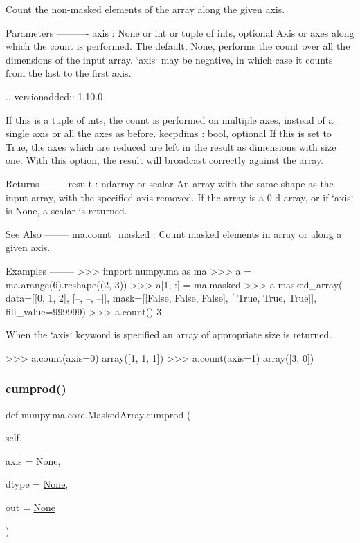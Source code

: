 \begin{DoxyVerb}Count the non-masked elements of the array along the given axis.

Parameters
----------
axis : None or int or tuple of ints, optional
    Axis or axes along which the count is performed.
    The default, None, performs the count over all
    the dimensions of the input array. `axis` may be negative, in
    which case it counts from the last to the first axis.

    .. versionadded:: 1.10.0

    If this is a tuple of ints, the count is performed on multiple
    axes, instead of a single axis or all the axes as before.
keepdims : bool, optional
    If this is set to True, the axes which are reduced are left
    in the result as dimensions with size one. With this option,
    the result will broadcast correctly against the array.

Returns
-------
result : ndarray or scalar
    An array with the same shape as the input array, with the specified
    axis removed. If the array is a 0-d array, or if `axis` is None, a
    scalar is returned.

See Also
--------
ma.count_masked : Count masked elements in array or along a given axis.

Examples
--------
>>> import numpy.ma as ma
>>> a = ma.arange(6).reshape((2, 3))
>>> a[1, :] = ma.masked
>>> a
masked_array(
  data=[[0, 1, 2],
[--, --, --]],
  mask=[[False, False, False],
[ True,  True,  True]],
  fill_value=999999)
>>> a.count()
3

When the `axis` keyword is specified an array of appropriate size is
returned.

>>> a.count(axis=0)
array([1, 1, 1])
>>> a.count(axis=1)
array([3, 0])\end{DoxyVerb}
 \mbox{\label{classnumpy_1_1ma_1_1core_1_1MaskedArray_a203ce0ea59caadb89acd6291e93e3be2}} 
\subsubsection{\texorpdfstring{cumprod()}{cumprod()}}
{\footnotesize\ttfamily def numpy.\+ma.\+core.\+Masked\+Array.\+cumprod (\begin{DoxyParamCaption}\item[{}]{self,  }\item[{}]{axis = {\ttfamily \hyperlink{namespacenumpy_1_1ma_1_1core_a647ee1848dfa3692fe35a663a2aa40b3}{None}},  }\item[{}]{dtype = {\ttfamily \hyperlink{namespacenumpy_1_1ma_1_1core_a647ee1848dfa3692fe35a663a2aa40b3}{None}},  }\item[{}]{out = {\ttfamily \hyperlink{namespacenumpy_1_1ma_1_1core_a647ee1848dfa3692fe35a663a2aa40b3}{None}} }\end{DoxyParamCaption})}

